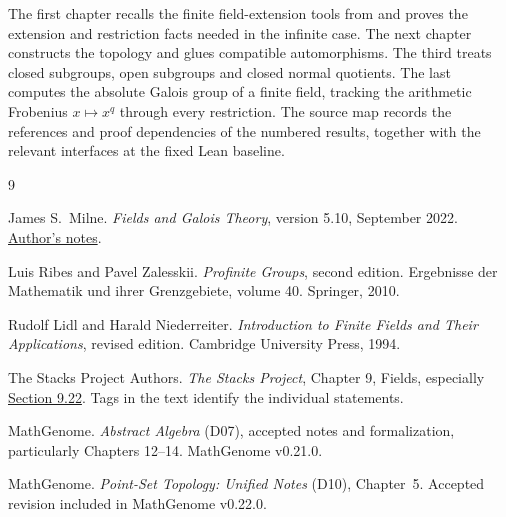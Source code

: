 \documentclass[11pt,oneside,openany]{book}
\theoremstyle{definition}
\theoremstyle{remark}
\begin{document}
The first chapter recalls the finite field-extension tools from
\cite[Chapters 12--14]{d07} and proves the extension and restriction
facts needed in the infinite case. The next chapter constructs the
topology and glues compatible automorphisms. The third treats closed
subgroups, open subgroups and closed normal quotients. The last computes
the absolute Galois group of a finite field, tracking the arithmetic
Frobenius \(x\mapsto x^q\) through every restriction. The source map
records the references and proof dependencies of the numbered results,
together with the relevant interfaces at the fixed Lean baseline.

\mainmatter





\backmatter
\begin{thebibliography}{9}

James S.~Milne.
\emph{Fields and Galois Theory}, version 5.10, September 2022.
\href{https://www.jmilne.org/math/CourseNotes/ft.html}{Author's notes}.

Luis Ribes and Pavel Zalesskii.
\emph{Profinite Groups}, second edition.
Ergebnisse der Mathematik und ihrer Grenzgebiete, volume 40.
Springer, 2010.

Rudolf Lidl and Harald Niederreiter.
\emph{Introduction to Finite Fields and Their Applications},
revised edition. Cambridge University Press, 1994.

The Stacks Project Authors.
\emph{The Stacks Project}, Chapter 9, Fields, especially
\href{https://stacks.math.columbia.edu/tag/0BMI}{Section 9.22}.
Tags in the text identify the individual statements.

MathGenome.
\emph{Abstract Algebra} (D07), accepted notes and formalization,
particularly Chapters 12--14. MathGenome v0.21.0.

MathGenome.
\emph{Point-Set Topology: Unified Notes} (D10), Chapter~5.
Accepted revision included in MathGenome v0.22.0.
\end{thebibliography}
\end{document}
